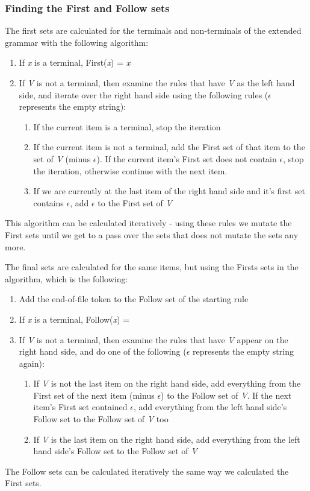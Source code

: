 \subsubsection{Finding the First and Follow sets} 
The first sets are calculated for the terminals and non-terminals of the extended grammar with the following algorithm:
\begin{enumerate}
\item If \textit{x} is a terminal, First(\textit{x}) = { \textit{x} }
\item If \textit{V} is not a terminal, then examine the rules that have \textit{V} as the left hand side, and iterate over the right hand side using the following rules ($\epsilon$ represents the empty string):
\begin{enumerate}
\item If the current item is a terminal, stop the iteration
\item If the current item is not a terminal, add the First set of that item to the set of \textit{V} (minus $\epsilon$). If the current item's First set does not contain $\epsilon$, stop the iteration, otherwise continue with the next item.
\item If we are currently at the last item of the right hand side and it's first set contains $\epsilon$, add $\epsilon$ to the First set of \textit{V}
\end{enumerate}
\end{enumerate}
This algorithm can be calculated iteratively - using these rules we mutate the First sets until we get to a pass over the sets that does not mutate the sets any more.

The final sets are calculated for the same items, but using the Firsts sets in the algorithm, which is the following:
\begin{enumerate}
\item Add the end-of-file token to the Follow set of the starting rule
\item If \textit{x} is a terminal, Follow(\textit{x}) = { }
\item If \textit{V} is not a terminal, then examine the rules that have \textit{V} appear on the right hand side, and do one of the following ($\epsilon$ represents the empty string again):
\begin{enumerate}
\item If \textit{V} is not the last item on the right hand side, add everything from the First set of the next item (minus $\epsilon$) to the Follow set of \textit{V}. If the next item's First set contained $\epsilon$, add everything from the left hand side's Follow set to the Follow set of \textit{V} too
\item If \textit{V} is the last item on the right hand side, add everything from the left hand side's Follow set to the Follow set of \textit{V}
\end{enumerate}
\end{enumerate}
The Follow sets can be calculated iteratively the same way we calculated the First sets.

